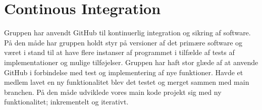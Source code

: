 \section{Continous Integration}\label{sec:contintegration}
Gruppen har anvendt GitHub til kontinuerlig integration og sikring af software. 
På den måde har gruppen holdt styr på versioner af det primære software 
og været i stand til at have flere instanser af programmet 
i tilfælde af tests af implementationer og mulige tilføjelser. 
Gruppen har haft stor glæde af at anvende GitHub i forbindelse med 
test og implementering af nye funktioner. 
Havde et medlem lavet en ny funktionalitet blev det testet og merget sammen med main branchen. 
På den måde udviklede vores main kode projekt sig med ny funktionalitet; inkrementelt og iterativt. 
